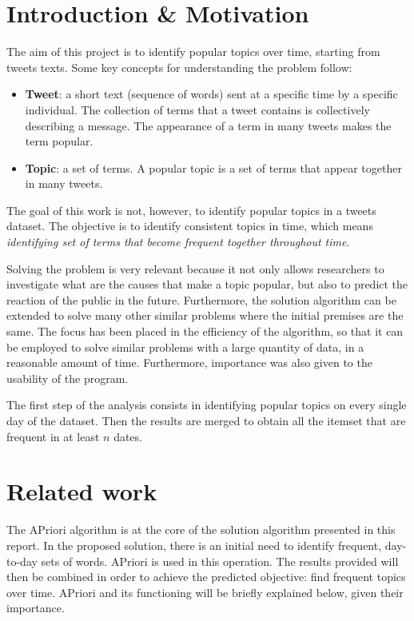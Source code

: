 
\section{Introduction \& Motivation}\label{sect_intro}

The aim of this project is to identify popular topics over time, starting from tweets texts. Some key concepts for understanding the problem follow:
\begin{itemize}
  \item \textbf{Tweet}: a short text (sequence of words) sent at a specific time by a specific individual. The collection of terms that a tweet contains is collectively describing a message. The appearance of a term in many tweets makes the term popular.
  \item \textbf{Topic}: a set of terms. A popular topic is a set of terms that appear together in many tweets.
\end{itemize}

The goal of this work is not, however, to identify popular topics in a tweets dataset. The objective is to identify consistent topics in time, which means \textit{identifying set of terms that become frequent together throughout time}.

Solving the problem is very relevant because it not only allows researchers to investigate what are the causes that make a topic popular, but also to predict the reaction of the public in the future. Furthermore, the solution algorithm can be extended to solve many other similar problems where the initial premises are the same. The focus has been placed in the efficiency of the algorithm, so that it can be employed to solve similar problems with a large quantity of data, in a reasonable amount of time. Furthermore, importance was also given to the usability of the program.

The first step of the analysis consists in identifying popular topics on every single day of the dataset. Then the results are merged to obtain all the itemset that are frequent in at least $n$ dates.


\section{Related work}\label{sect_rel_work}

The APriori algorithm is at the core of the solution algorithm presented in this report. In the proposed solution, there is an initial need to identify frequent, day-to-day sets of words. APriori is used in this operation. The results provided will then be combined in order to achieve the predicted objective: find frequent topics over time. APriori and its functioning will be briefly explained below, given their importance.

